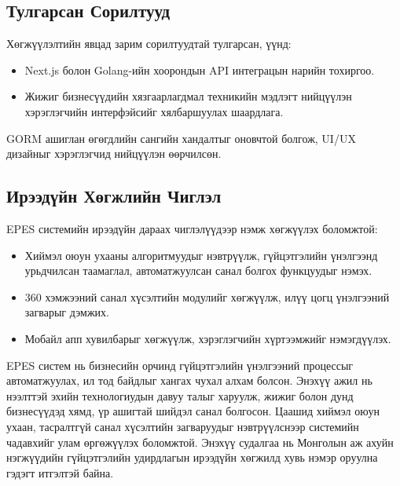 \subsection{Тулгарсан Сорилтууд}
Хөгжүүлэлтийн явцад зарим сорилтуудтай тулгарсан, үүнд:
\begin{itemize}
    \item Next.js болон Golang-ийн хоорондын API интеграцын нарийн тохиргоо.
    \item Жижиг бизнесүүдийн хязгаарлагдмал техникийн мэдлэгт нийцүүлэн хэрэглэгчийн интерфэйсийг хялбаршуулах шаардлага.
\end{itemize}
GORM ашиглан өгөгдлийн сангийн хандалтыг оновчтой болгож, UI/UX дизайныг хэрэглэгчид нийцүүлэн өөрчилсөн.

\subsection{Ирээдүйн Хөгжлийн Чиглэл}
EPES системийн ирээдүйн дараах чиглэлүүдээр нэмж хөгжүүлэх боломжтой:
\begin{itemize}
    \item Хиймэл оюун ухааны алгоритмуудыг нэвтрүүлж, гүйцэтгэлийн үнэлгээнд урьдчилсан таамаглал, автоматжуулсан санал болгох функцуудыг нэмэх.
    \item 360 хэмжээний санал хүсэлтийн модулийг хөгжүүлж, илүү цогц үнэлгээний загварыг дэмжих.
    \item Мобайл апп хувилбарыг хөгжүүлж, хэрэглэгчийн хүртээмжийг нэмэгдүүлэх.
\end{itemize}

EPES систем нь бизнесийн орчинд гүйцэтгэлийн үнэлгээний процессыг автоматжуулах, ил тод байдлыг хангах чухал алхам болсон. Энэхүү ажил 
нь нээлттэй эхийн технологиудын давуу талыг харуулж, жижиг болон дунд бизнесүүдэд хямд, үр ашигтай шийдэл санал болгосон. Цаашид хиймэл оюун 
ухаан, тасралтгүй санал хүсэлтийн загваруудыг нэвтрүүлснээр системийн чадавхийг улам өргөжүүлэх боломжтой. Энэхүү судалгаа нь Монголын аж 
ахуйн нэгжүүдийн гүйцэтгэлийн удирдлагын ирээдүйн хөгжилд хувь нэмэр оруулна гэдэгт итгэлтэй байна.